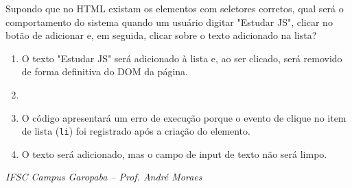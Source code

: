 \documentclass[12pt,a4paper]{article}
\newcommand{\correto}[1]{\iftoggle{gabarito}{\textcolor{corGabarito}{\textbf{#1}}}{#1}}
\begin{document}
Supondo que no HTML existam os elementos com seletores corretos, qual será o comportamento do sistema quando um usuário digitar "Estudar JS", clicar no botão de adicionar e, em seguida, clicar sobre o texto adicionado na lista?
\begin{enumerate}[label=(\alph*)]
    \item O texto "Estudar JS" será adicionado à lista e, ao ser clicado, será removido de forma definitiva do DOM da página.
    \item \correto{O texto "Estudar JS" será inserido na lista e, ao receber o clique, terá a classe CSS "concluida" alternada (adicionada ou removida), possibilitando estilização visual dinâmica.}
    \item O código apresentará um erro de execução porque o evento de clique no item de lista (\texttt{li}) foi registrado após a criação do elemento.
    \item O texto será adicionado, mas o campo de input de texto não será limpo.
\end{enumerate}

\vfill
\begin{center}
    \footnotesize \textit{IFSC Campus Garopaba -- Prof. André Moraes}
\end{center}
\end{document}

